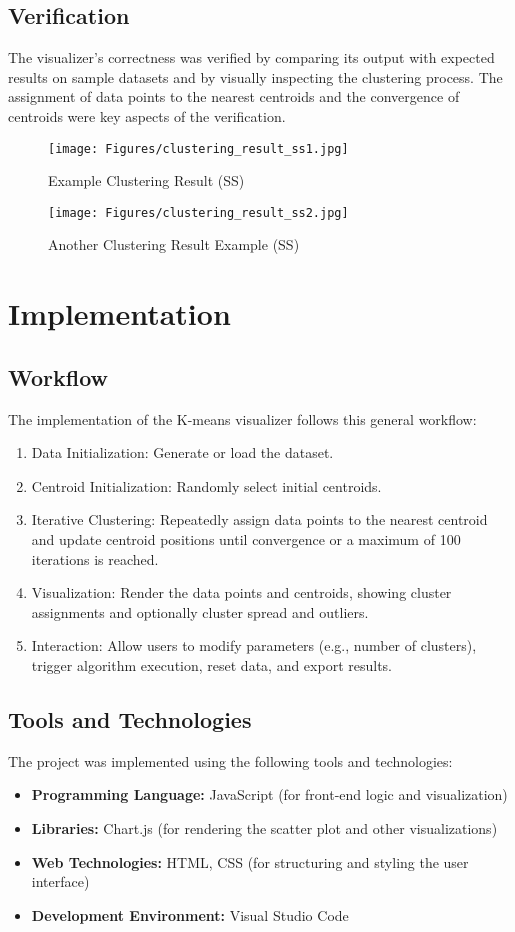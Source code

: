 \documentclass[12pt]{report}
\begin{document}
\subsection{Verification}
The visualizer's correctness was verified by comparing its output with expected results on sample datasets and by visually inspecting the clustering process. The assignment of data points to the nearest centroids and the convergence of centroids were key aspects of the verification.
\begin{figure}[h]
        \centering
        \texttt{[image: Figures/clustering\_result\_ss1.jpg]}
        \caption{Example Clustering Result (SS)}
        \centering
        \texttt{[image: Figures/clustering\_result\_ss2.jpg]}
        \caption{Another Clustering Result Example (SS)}
\end{figure}
\newpage

\section{Implementation}
\subsection{Workflow}
The implementation of the K-means visualizer follows this general workflow:
\begin{enumerate}
    \item Data Initialization: Generate or load the dataset.
    \item Centroid Initialization: Randomly select initial centroids.
    \item Iterative Clustering: Repeatedly assign data points to the nearest centroid and update centroid positions until convergence or a maximum of 100 iterations is reached.
    \item Visualization: Render the data points and centroids, showing cluster assignments and optionally cluster spread and outliers.
    \item Interaction: Allow users to modify parameters (e.g., number of clusters), trigger algorithm execution, reset data, and export results.
\end{enumerate}
\subsection{Tools and Technologies}
The project was implemented using the following tools and technologies:
\begin{itemize}
    \item \textbf{Programming Language:} JavaScript (for front-end logic and visualization)
    \item \textbf{Libraries:} Chart.js (for rendering the scatter plot and other visualizations)
    \item \textbf{Web Technologies:} HTML, CSS (for structuring and styling the user interface)
    \item \textbf{Development Environment:} Visual Studio Code
\end{itemize}
\end{document}
